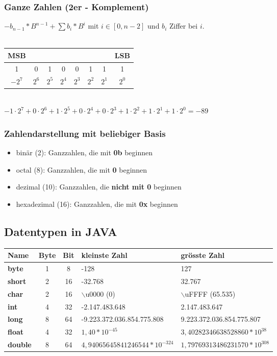 \documentclass[a4paper,10pt]{article}
\newcommand{\Bold}[1]{\textbf{#1}} %
\begin{document}
\subsubsection{Ganze Zahlen (2er - Komplement)}
$-b_{n-1}*B^{n-1}+\sum b_i*B^i$ mit $i \in [0,n-2]$ und  $b_i$ Ziffer bei $i$.\\\\
\begin{tabular}{|c|c|c|c|c|c|c|c|}
\multicolumn{1}{c}{MSB}&\multicolumn{6}{c}{}&\multicolumn{1}{c}{LSB}\\ \hline
1&0&1&0&0&1&1&1\\\hline
\multicolumn{1}{c}{$-2^7$}&\multicolumn{1}{c}{$2^6$}&\multicolumn{1}{c}{$2^5$}&\multicolumn{1}{c}{$2^4$}&\multicolumn{1}{c}{$2^3$}&\multicolumn{1}{c}{$2^2$}&\multicolumn{1}{c}{$2^1$}&\multicolumn{1}{c}{$2^0$}\\
\end{tabular}\\
$-1\cdot 2^7+0\cdot 2^6+1\cdot 2^5+0\cdot 2^4+0\cdot 2^3+1\cdot 2^2+1\cdot 2^1+1\cdot 2^0=-89$\\
\subsubsection{Zahlendarstellung mit beliebiger Basis}
\begin{itemize}
\item bin\"ar (2): Ganzzahlen, die mit \Bold{0b} beginnen
\item octal (8): Ganzzahlen, die mit \Bold{0} beginnen
\item dezimal (10): Ganzzahlen, die \Bold{nicht mit 0} beginnen
\item  hexadezimal (16): Ganzzahlen, die mit \Bold{0x} beginnen
\end{itemize}

\subsection{Datentypen in JAVA}
\begin{tabular}{l c c l l}
	Name & Byte & Bit & kleinste Zahl & gr\"osste Zahl \\
	\hline
	\Bold {byte} & 1 & 8 & -128 & 127 \\
	\Bold {short} & 2 & 16 &-32.768 & 32.767 \\
	\Bold {char} & 2 & 16 & $\backslash$u0000 (0) & 	$\backslash$uFFFF (65.535) \\
	\Bold {int} & 4 & 32 & -2.147.483.648 & 2.147.483.647 \\
	\Bold {long} & 8 & 64 & -9.223.372.036.854.775.808 & 9.223.372.036.854.775.807 \\
	\Bold {float} & 4 & 32 & $1,40 * 10^{-45}$ & $3,40282346638528860 * 10^{38}$ \\
	\Bold {double} & 8 & 64 & $4,94065645841246544*10^{-324}$ & $1,79769313486231570*10^{308}$  \\
\end{tabular}
\end{document}
